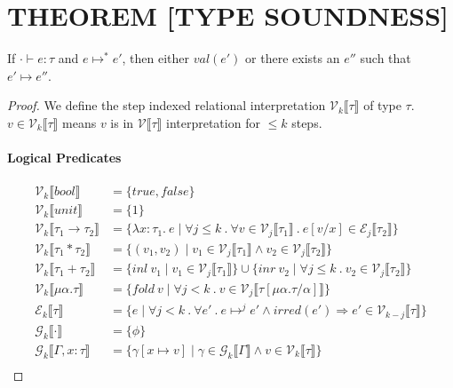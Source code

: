 \documentclass{article}
\begin{document}
\newpage
\section{THEOREM [TYPE SOUNDNESS]}
If $\cdot \vdash e : \tau$ and $e \mapsto^* e'$, then either $val(e')$ or there exists an $e''$ such that $e' \mapsto e''$.

\begin{proof}
  
  We define the step indexed relational interpretation $\mathcal{V}_k \llbracket \tau \rrbracket$ of type $\tau$.\\
  $v \in \mathcal{V}_k \llbracket \tau \rrbracket$ means $v$ is in $\mathcal{V} \llbracket \tau \rrbracket$ interpretation for $\leq k$ steps.\\

\paragraph{Logical Predicates}
\begin{align*}
\mathcal{V}_k \llbracket bool \rrbracket &= \{true, false \}\\
\mathcal{V}_k \llbracket unit \rrbracket &= \{ 1 \}\\  
\mathcal{V}_k \llbracket \tau_1 \rightarrow \tau_2 \rrbracket &= \{ \lambda x:\tau_1.~e \mid \forall j \leq k ~.~\forall v \in \mathcal{V}_j \llbracket \tau_1 \rrbracket~.~e[v/x] \in \mathcal{E}_j \llbracket \tau_2 \rrbracket \}\\
\mathcal{V}_k \llbracket \tau_1 * \tau_2 \rrbracket &= \{(v_1, v_2) \mid v_1 \in \mathcal{V}_j \llbracket \tau_1 \rrbracket \wedge v_2 \in \mathcal{V}_j \llbracket \tau_2 \rrbracket \}\\
\mathcal{V}_k \llbracket \tau_1 + \tau_2 \rrbracket &= \{inl~v_1 \mid v_1 \in \mathcal{V}_j \llbracket \tau_1 \rrbracket\} \cup \{inr~v_2 \mid \forall j \leq k ~.~ v_2 \in \mathcal{V}_j \llbracket \tau_2 \rrbracket\}\\
\mathcal{V}_k \llbracket \mu \alpha.\tau \rrbracket &= \{fold~v \mid \forall j < k ~.~ v \in \mathcal{V}_j \llbracket \tau[\mu \alpha.\tau / \alpha] \rrbracket\}\\
\mathcal{E}_k \llbracket \tau \rrbracket &= \{ e \mid \forall j < k ~.~ \forall e'~.~e \mapsto^j e' \wedge irred(e') \Rightarrow e' \in \mathcal{V}_{k-j} \llbracket \tau \rrbracket \}\\
\mathcal{G}_k \llbracket \cdot \rrbracket &= \{ \phi \}\\
\mathcal{G}_k \llbracket \Gamma,x:\tau \rrbracket &= \{ \gamma[x \mapsto v] \mid \gamma \in \mathcal{G}_k \llbracket \Gamma \rrbracket \wedge v \in \mathcal{V}_k \llbracket \tau \rrbracket \}\\
\end{align*}



\end{proof}
\end{document}
